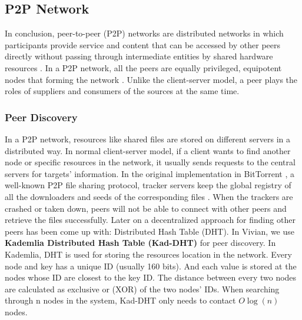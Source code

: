 \subsection{P2P Network}

In conclusion, peer-to-peer (P2P) networks are distributed networks in which participants provide service and content that can be accessed by other peers directly without passing through intermediate entities by shared hardware resources \cite{990434}.
In a P2P network, all the peers are equally privileged, equipotent nodes that forming the network \cite{nemat2011taking}. Unlike the client-server model, a peer plays the roles of suppliers and consumers of the sources at the same time.

\subsubsection{Peer Discovery}
In a P2P network, resources like shared files are stored on different servers in a distributed way.
In normal client-server model, if a client wants to find another node or specific resources in the network, it usually sends requests to the central servers for targets' information.
In the original implementation in BitTorrent \cite{bram_2008}, a well-known P2P file sharing protocol, tracker servers keep the global registry of all the downloaders and seeds of the corresponding files \cite{pouwelse2005bittorrent}.
When the trackers are crashed or taken down, peers will not be able to connect with other peers and retrieve the files successfully. Later on a decentralized approach for finding other peers has been come up with: Distributed Hash Table (DHT).
In Vivian, we use \textbf{Kademlia Distributed Hash Table (Kad-DHT)} \cite{maymounkov2002kademlia} for peer discovery. In Kademlia, DHT is used for storing the resources location in the network. Every node and key has a unique ID (usually 160 bits). 
And each value is stored at the nodes whose ID are closest to the key ID. The distance between every two nodes are calculated as exclusive or (XOR) of the two nodes' IDs. 
When searching through n nodes in the system, Kad-DHT only needs to contact $O\log (n)$ nodes.

